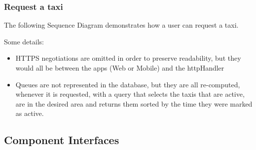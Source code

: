 \documentclass{article}
\begin{document}
\subsubsection{Request a taxi}
The following Sequence Diagram demonstrates how a user can request a taxi.
\begin{figure}[H]
\end{figure}
Some details:
\begin{itemize}
	\item HTTPS negotiations are omitted in order to preserve readability, but they would all be between the apps (Web or Mobile) and the httpHandler %
	\item Queues are not represented in the database, but they are all re-computed, whenever it is requested, with a query that selects the taxis that are active, are in the desired area and returns them sorted by the time they were marked as active.
\end{itemize}
\subsection{Component Interfaces}
\end{document}
